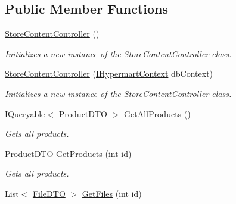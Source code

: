 \subsection*{Public Member Functions}
\begin{DoxyCompactItemize}
\item 
\hyperlink{class_open_1_1_g_i_1_1hypermart_1_1_controllers_1_1_store_content_controller_a01bad24ca04f869ec58d136ff35b2d13}{Store\+Content\+Controller} ()
\begin{DoxyCompactList}\small\item\em Initializes a new instance of the \hyperlink{class_open_1_1_g_i_1_1hypermart_1_1_controllers_1_1_store_content_controller}{Store\+Content\+Controller} class. \end{DoxyCompactList}\item 
\hyperlink{class_open_1_1_g_i_1_1hypermart_1_1_controllers_1_1_store_content_controller_ad8b3b3f13892bbb028eb21b7e240d7e2}{Store\+Content\+Controller} (\hyperlink{interface_open_1_1_g_i_1_1hypermart_1_1_d_a_l_1_1_i_hypermart_context}{I\+Hypermart\+Context} db\+Context)
\begin{DoxyCompactList}\small\item\em Initializes a new instance of the \hyperlink{class_open_1_1_g_i_1_1hypermart_1_1_controllers_1_1_store_content_controller}{Store\+Content\+Controller} class. \end{DoxyCompactList}\item 
I\+Queryable$<$ \hyperlink{class_open_1_1_g_i_1_1hypermart_1_1_data_transformation_objects_1_1_product_d_t_o}{Product\+D\+T\+O} $>$ \hyperlink{class_open_1_1_g_i_1_1hypermart_1_1_controllers_1_1_store_content_controller_ac0cf1a9777a6cb4978fbd1507dea8bbf}{Get\+All\+Products} ()
\begin{DoxyCompactList}\small\item\em Gets all products. \end{DoxyCompactList}\item 
\hyperlink{class_open_1_1_g_i_1_1hypermart_1_1_data_transformation_objects_1_1_product_d_t_o}{Product\+D\+T\+O} \hyperlink{class_open_1_1_g_i_1_1hypermart_1_1_controllers_1_1_store_content_controller_ad3f08d02ef5cfef7ebc87820568a2ee5}{Get\+Products} (int id)
\begin{DoxyCompactList}\small\item\em Gets all products. \end{DoxyCompactList}\item 
List$<$ \hyperlink{class_open_1_1_g_i_1_1hypermart_1_1_data_transformation_objects_1_1_file_d_t_o}{File\+D\+T\+O} $>$ \hyperlink{class_open_1_1_g_i_1_1hypermart_1_1_controllers_1_1_store_content_controller_ae0b56b375fd34ca44fd3d7c32be04c04}{Get\+Files} (int id)

\end{DoxyCompactItemize}
